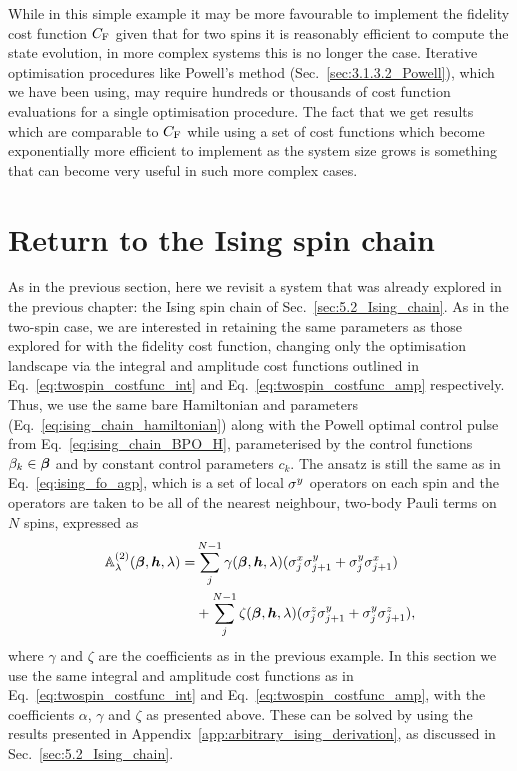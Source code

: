 While in this simple example it may be more favourable to implement the fidelity cost function $C_{\rm F}$ given that for two spins it is reasonably efficient to compute the state evolution, in more complex systems this is no longer the case. Iterative optimisation procedures like Powell's method (Sec.~\ref{sec:3.1.3.2_Powell}), which we have been using, may require hundreds or thousands of cost function evaluations for a single optimisation procedure. The fact that we get results which are comparable to $C_{\rm F}$ while using a set of cost functions which become exponentially more efficient to implement as the system size grows is something that can become very useful in such more complex cases.

\section{Return to the Ising spin chain}\label{sec:7.2_ising_ho_lcd}

As in the previous section, here we revisit a system that was already explored in the previous chapter: the Ising spin chain of Sec.~\ref{sec:5.2_Ising_chain}. As in the two-spin case, we are interested in retaining the same parameters as those explored for  with the fidelity cost function, changing only the optimisation landscape via the integral and amplitude cost functions outlined in Eq.~\eqref{eq:twospin_costfunc_int} and Eq.~\eqref{eq:twospin_costfunc_amp} respectively. Thus, we use the same bare Hamiltonian and parameters (Eq.~\eqref{eq:ising_chain_hamiltonian}) along with the Powell optimal control pulse from Eq.~\eqref{eq:ising_chain_BPO_H}, parameterised by the control functions $\beta_k \in \boldsymbol{\beta}$ and by constant control parameters $c_k$. The   ansatz is still the same as in Eq.~\eqref{eq:ising_fo_agp}, which is a set of local $\sigma^y$ operators on each spin and the  operators are taken to be all of the nearest neighbour, two-body Pauli terms on $N$ spins, expressed as
\begin{equation}\label{eq:ising_so_lcd_terms}
    \begin{aligned}
        \mathbb{A}_{\lambda}^{(2)}(\boldsymbol{\beta}, \boldsymbol{h}, \lambda) = & \sum_j^{N-1} \gamma(\boldsymbol{\beta}, \boldsymbol{h}, \lambda) (\sigma^x_j\sigma^y_{j+1} + \sigma^y_j\sigma^x_{j+1}) \\
        &+ \sum_j^{N-1} \zeta(\boldsymbol{\beta}, \boldsymbol{h}, \lambda) (\sigma^z_j\sigma^y_{j+1} + \sigma^y_j\sigma^z_{j+1}),
    \end{aligned}
\end{equation}
where $\gamma$ and $\zeta$ are the   coefficients as in the previous example. In this section we use the same integral and amplitude cost functions as in Eq.~\eqref{eq:twospin_costfunc_int} and Eq.~\eqref{eq:twospin_costfunc_amp}, with the coefficients $\alpha$, $\gamma$ and $\zeta$ as presented above. These can be solved by using the results presented in Appendix~\ref{app:arbitrary_ising_derivation}, as discussed in Sec.~\ref{sec:5.2_Ising_chain}.

